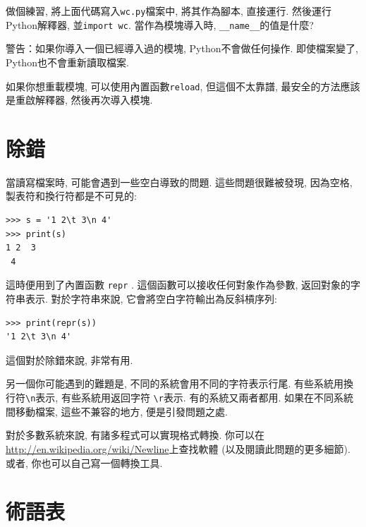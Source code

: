 \documentclass[10pt]{book}
\begin{document}
做個練習, 將上面代碼寫入{\tt wc.py}檔案中, 將其作為腳本, 直接運行. 
然後運行Python解釋器, 並{\tt import wc}. 
當作為模塊導入時, \verb"__name__"的值是什麼?

警告：如果你導入一個已經導入過的模塊, Python不會做任何操作. 
即使檔案變了, Python也不會重新讀取檔案. 

如果你想重載模塊, 可以使用內置函數{\tt reload}, 
但這個不太靠譜, 最安全的方法應該是重啟解釋器, 然後再次導入模塊. 

\section{除錯}

當讀寫檔案時, 可能會遇到一些空白導致的問題. 
這些問題很難被發現, 因為空格, 製表符和換行符都是不可見的:

\begin{verbatim}
>>> s = '1 2\t 3\n 4'
>>> print(s)
1 2  3
 4
\end{verbatim}

這時便用到了內置函數 {\tt repr} . 
這個函數可以接收任何對象作為參數, 返回對象的字符串表示. 
對於字符串來說, 它會將空白字符輸出為反斜槓序列:

\begin{verbatim}
>>> print(repr(s))
'1 2\t 3\n 4'
\end{verbatim}

這個對於除錯來說, 非常有用. 

另一個你可能遇到的難題是, 不同的系統會用不同的字符表示行尾. 
有些系統用換行符\verb"\n"表示, 有些系統用返回字符 \verb"\r"表示. 
有的系統又兩者都用. 
如果在不同系統間移動檔案, 這些不兼容的地方, 便是引發問題之處. 

對於多數系統來說, 有諸多程式可以實現格式轉換. 
你可以在\url{http://en.wikipedia.org/wiki/Newline}上查找軟體
(以及閱讀此問題的更多細節). 
或者, 你也可以自己寫一個轉換工具. 


\section{術語表}
\end{document}
